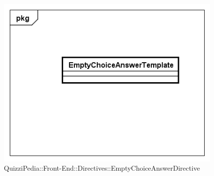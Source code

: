 		\label{QuizziPedia::Front-End::Directives::EmptySpaceAnswerDirective}
		
		\begin{figure}[ht]
			\centering
			\includegraphics[scale=0.80,keepaspectratio]{UML/Classi/Front-End/QuizziPedia_Front-end_Templates_EmptySpaceAnswerTemplate.png}
			\caption{QuizziPedia::Front-End::Directives::EmptyChoiceAnswerDirective}
		\end{figure} \FloatBarrier
		
